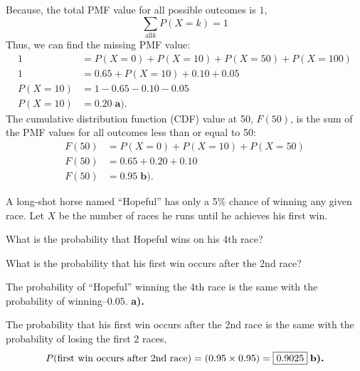 \documentclass[a4paper, 10pt]{article}
\begin{document}
\begin{solution}
Because, the total PMF value for all possible outcomes is \( 1 \),
\[
    \sum_{\text{all} k} P(X = k) = 1
\]
Thus, we can find the missing PMF value:
\begin{align*}
    1 &= P(X = 0) + P(X = 10) + P(X = 50) + P(X = 100) \\
    1 &= 0.65 + P(X = 10) + 0.10 + 0.05 \\
    P(X = 10) &= 1 - 0.65 - 0.10 - 0.05 \\
    P(X = 10) &= \boxed{0.20} \; \textbf{a).}
\end{align*}
The cumulative distribution function (CDF) value at 50, \( F(50) \),
is the sum of the PMF values for all outcomes less than or equal to 50:
\begin{align*}
    F(50) &= P(X = 0) + P(X = 10) + P(X = 50) \\
    F(50) &= 0.65 + 0.20 + 0.10 \\
    F(50) &= \boxed{0.95} \; \textbf{b).}
\end{align*}
\end{solution}


\begin{tosubmit}
\problem[5]
A long-shot horse named ``Hopeful'' has only a 5\% chance of winning any given race.
Let \( X \) be the number of races he runs until he achieves his first win.
\begin{subproblems}
    \item What is the probability that Hopeful wins on his 4th race?
    \item What is the probability that his first win occurs after the 2nd race?
\end{subproblems}

\par\noindent\submitsolution
The probability of ``Hopeful'' winning the 4th race is the same with the probability of winning--\(\boxed{0.05}\). \textbf{a).}

\noindent The probability that his first win occurs after the 2nd race is
the same with the probability of losing the first 2 races,
\[
    P(\text{first win occurs after 2nd race}) = \left(0.95 \times 0.95\right) = \boxed{0.9025} \; \textbf{b).}  \\
\]
\end{tosubmit}
\end{document}
